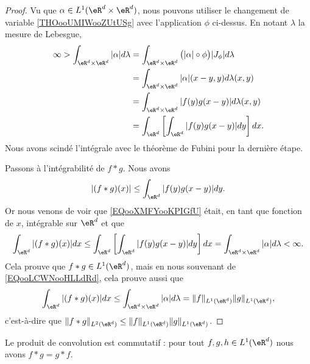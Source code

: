 \begin{proof}
	Vu que \( \alpha\in L^1(\eR^d\times \eR^d)\), nous pouvons utiliser le changement de variable \ref{THOooUMIWooZUtUSg} avec l'application \( \phi\) ci-dessus. En notant \( \lambda\) la mesure de Lebesgue,
	\begin{subequations}
		\begin{align}
			\infty>\int_{\eR^d\times \eR^d}| \alpha |d\lambda & =\int_{\eR^d\times \eR^d}\big( | \alpha |\circ\phi \big)| J_{\phi} |d\lambda \\
			                                                  & =\int_{\eR^d\times \eR^d}| \alpha |(x-y,y)d\lambda(x,y)                      \\
			                                                  & =\int_{\eR^d\times \eR^d}| f(y)g(x-y) |d\lambda(x,y)                         \\
			                                                  & =\int_{\eR^d}\left[ \int_{\eR^d}| f(y)g(x-y) |dy \right]dx.
		\end{align}
	\end{subequations}
	Nous avons scindé l'intégrale avec le théorème de Fubini pour la dernière étape.

	Passons à l'intégrabilité de \( f*g\). Nous avons
	\begin{equation}        \label{EQooXMFYooKPIGfU}
		| (f*g)(x) |\leq \int_{\eR^d}| f(y)g(x-y) |dy.
	\end{equation}
	Or nous venons de voir que \eqref{EQooXMFYooKPIGfU} était, en tant que fonction de \( x\), intégrable sur \( \eR^d\) et que
	\begin{equation}
		\int_{\eR^d}| (f*g)(x) |dx\leq\int_{\eR^d}\left[ \int_{\eR^d}| f(y)g(x-y) |dy \right]dx=\int_{\eR^d\times \eR^d}| \alpha |d\lambda<\infty.
	\end{equation}
	Cela prouve que \( f*g\in L^1(\eR^d)\), mais en nous souvenant de \eqref{EQooLCWNooHLLdRd}, cela prouve aussi que
	\begin{equation}
		\int_{\eR^d}| (f*g)(x) |dx\leq\int_{\eR^d\times \eR^d}| \alpha |d\lambda=\| f \|_{L^1(\eR^d)}\| g \|_{L^1(\eR^d)},
	\end{equation}
	c'est-à-dire que \( \| f*g \|_{L^2(\eR^d)}\leq \| f \|_{L^1(\eR^d)}\| g \|_{L^1(\eR^d)}\).
\end{proof}

\begin{lemma}       \label{LEMooMRWZooHjrnHD}
	Le produit de convolution est commutatif : pour tout \( f,g,h\in L^1(\eR^d)\) nous avons \( f*g=g*f\).
\end{lemma}

